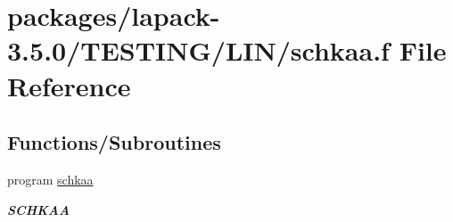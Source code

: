\hypertarget{schkaa_8f}{}\section{packages/lapack-\/3.5.0/\+T\+E\+S\+T\+I\+N\+G/\+L\+I\+N/schkaa.f File Reference}
\label{schkaa_8f}
\subsection*{Functions/\+Subroutines}
\begin{DoxyCompactItemize}
\item 
program \hyperlink{group__single__lin_ga14d348e1e2f68acec6d8194588747cd8}{schkaa}
\begin{DoxyCompactList}\small\item\em {\bfseries S\+C\+H\+K\+A\+A} \end{DoxyCompactList}\end{DoxyCompactItemize}
